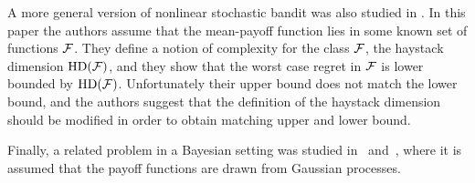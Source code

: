 A more general version of nonlinear stochastic bandit was also studied in \cite{AKS11}. In this paper the authors assume that the mean-payoff function lies in some known set of functions $\mathcal{F}$. They define a notion of complexity for the class $\mathcal{F}$, the haystack dimension $\mathrm{HD}(\mathcal{F})$, and they show that the worst case regret in $\mathcal{F}$ is lower bounded by $\mathrm{HD}(\mathcal{F})$. Unfortunately their upper bound does not match the lower bound, and the authors suggest that the definition of the haystack dimension should be modified in order to obtain matching upper and lower bound.

Finally, a related problem in a Bayesian setting was studied in~\cite{SKKS10} and~\cite{GAOS10}, where it is assumed that the payoff functions are drawn from Gaussian processes.

%
%
%
%
